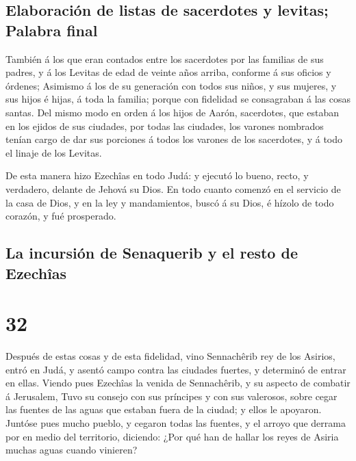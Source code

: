 \hypertarget{elaboraciuxf3n-de-listas-de-sacerdotes-y-levitas-palabra-final}{%
\subsection{Elaboración de listas de sacerdotes y levitas; Palabra
final}\label{elaboraciuxf3n-de-listas-de-sacerdotes-y-levitas-palabra-final}}

 También á los que eran contados entre los sacerdotes por
las familias de sus padres, y á los Levitas de edad de veinte años
arriba, conforme á sus oficios y órdenes;  Asimismo á los
de su generación con todos sus niños, y sus mujeres, y sus hijos é
hijas, á toda la familia; porque con fidelidad se consagraban á las
cosas santas.  Del mismo modo en orden á los hijos de
Aarón, sacerdotes, que estaban en los ejidos de sus ciudades, por todas
las ciudades, los varones nombrados tenían cargo de dar sus porciones á
todos los varones de los sacerdotes, y á todo el linaje de los Levitas.

 De esta manera hizo Ezechîas en todo Judá: y ejecutó lo
bueno, recto, y verdadero, delante de Jehová su Dios.  En
todo cuanto comenzó en el servicio de la casa de Dios, y en la ley y
mandamientos, buscó á su Dios, é hízolo de todo corazón, y fué
prosperado.

\hypertarget{la-incursiuxf3n-de-senaquerib-y-el-resto-de-ezechuxeeas}{%
\subsection{La incursión de Senaquerib y el resto de
Ezechîas}\label{la-incursiuxf3n-de-senaquerib-y-el-resto-de-ezechuxeeas}}

\hypertarget{section-14-32}{%
\section{32}\label{section-14-32}}

 Después de estas cosas y de esta fidelidad, vino
Sennachêrib rey de los Asirios, entró en Judá, y asentó campo contra las
ciudades fuertes, y determinó de entrar en ellas.  Viendo
pues Ezechîas la venida de Sennachêrib, y su aspecto de combatir á
Jerusalem,  Tuvo su consejo con sus príncipes y con sus
valerosos, sobre cegar las fuentes de las aguas que estaban fuera de la
ciudad; y ellos le apoyaron.  Juntóse pues mucho pueblo, y
cegaron todas las fuentes, y el arroyo que derrama por en medio del
territorio, diciendo: ¿Por qué han de hallar los reyes de Asiria muchas
aguas cuando vinieren?

